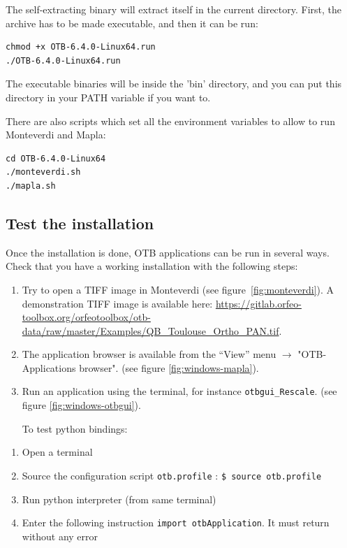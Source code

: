 \documentclass[10pt,a4paper]{article}
\begin{document}
The self-extracting binary will extract itself in the current directory. First, the archive has to be made executable, and then it can be run:
\begin{verbatim}
chmod +x OTB-6.4.0-Linux64.run
./OTB-6.4.0-Linux64.run
\end{verbatim}

The executable binaries will be inside the 'bin' directory, and you can put this directory in your PATH variable if you want to. 

There are also scripts which set all the environment variables to allow to run Monteverdi and Mapla:
\begin{verbatim}
cd OTB-6.4.0-Linux64
./monteverdi.sh
./mapla.sh
\end{verbatim}

\subsection{Test the installation}
Once the installation is done, OTB applications can be run in several ways. Check that you have a working installation with the following steps:
\begin{enumerate}

\item Try to open a TIFF image in Monteverdi (see
figure~\ref{fig:monteverdi}). A demonstration TIFF image is available here: \url{https://gitlab.orfeo-toolbox.org/orfeotoolbox/otb-data/raw/master/Examples/QB\_Toulouse\_Ortho\_PAN.tif}.

\item The application browser is available from the ``View'' menu 
$\rightarrow$ "OTB-Applications browser".
(see figure \ref{fig:windows-mapla}).

\item Run an application using the terminal, for instance
\texttt{otbgui\_Rescale}. (see figure \ref{fig:windows-otbgui}).

To test python bindings:

\end{enumerate}

\begin{enumerate}
 \item Open a terminal
 \item Source the configuration script \verb?otb.profile? : \verb?$ source otb.profile?
 \item Run python interpreter (from same terminal)
 \item Enter the following instruction \verb?import otbApplication?. It must return without any error
\end{enumerate}
\end{document}
